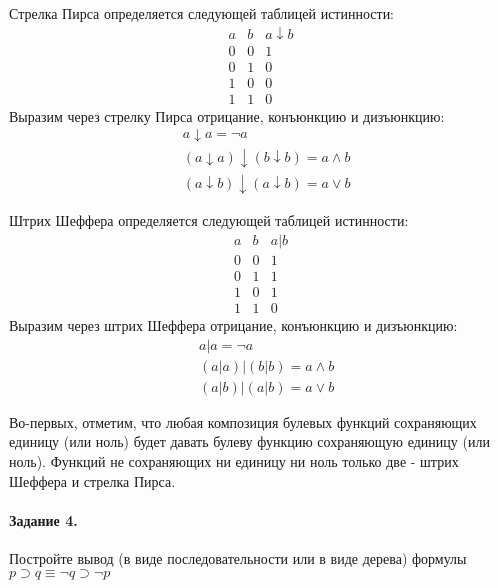 \documentclass[a4paper,12pt]{article}
\begin{document}
\begin{Solution}
Стрелка Пирса определяется следующей таблицей истинности:
\[
	\begin{matrix}
		a & b & a \downarrow b \\
		0 & 0 & 1 \\
		0 & 1 & 0 \\
		1 & 0 & 0 \\
		1 & 1 & 0
	\end{matrix}
\]
Выразим через стрелку Пирса отрицание, конъюнкцию и дизъюнкцию:
\[
	\begin{split}
		& a \downarrow a = \neg a \\
		& \left(a \downarrow a\right) \downarrow \left(b \downarrow b\right) = a \land b \\
		& \left(a \downarrow b\right) \downarrow \left(a \downarrow b\right) = a \lor b
	\end{split}
\]

Штрих Шеффера определяется следующей таблицей истинности:
\[
	\begin{matrix}
		a & b & a | b \\
		0 & 0 & 1 \\
		0 & 1 & 1 \\
		1 & 0 & 1 \\
		1 & 1 & 0
	\end{matrix}
\]
Выразим через штрих Шеффера отрицание, конъюнкцию и дизъюнкцию:
\[
	\begin{split}
		& a | a = \neg a \\
		& \left(a | a\right) | \left(b | b\right) = a \land b \\
		& \left(a | b\right) | \left(a | b\right) = a \lor b
	\end{split}
\]

Во-первых, отметим, что любая композиция булевых функций сохраняющих единицу (или ноль) будет давать булеву функцию сохраняющую единицу (или ноль). Функций не сохраняющих ни единицу ни ноль только две - штрих Шеффера и стрелка Пирса.
\end{Solution}

\paragraph{Задание 4.} Постройте вывод (в виде последовательности или в виде дерева) формулы $p \supset q \equiv \neg q \supset \neg p$
\end{document}
